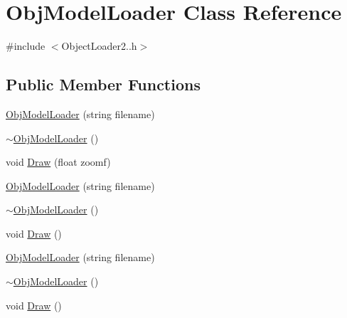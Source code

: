 \hypertarget{class_obj_model_loader}{}\section{Obj\+Model\+Loader Class Reference}
\label{class_obj_model_loader}


{\ttfamily \#include $<$Object\+Loader2..\+h$>$}

\subsection*{Public Member Functions}
\begin{DoxyCompactItemize}
\item 
\mbox{\hyperlink{class_obj_model_loader_afcdb98fbbeba6fa0551b772ca959347d}{Obj\+Model\+Loader}} (string filename)
\item 
\mbox{\hyperlink{class_obj_model_loader_a203757d2c67c25889be3d61f140bc365}{$\sim$\+Obj\+Model\+Loader}} ()
\item 
void \mbox{\hyperlink{class_obj_model_loader_ae71538b366c781ec45f7ebe4fec84ed7}{Draw}} (float zoomf)
\item 
\mbox{\hyperlink{class_obj_model_loader_afcdb98fbbeba6fa0551b772ca959347d}{Obj\+Model\+Loader}} (string filename)
\item 
\mbox{\hyperlink{class_obj_model_loader_a203757d2c67c25889be3d61f140bc365}{$\sim$\+Obj\+Model\+Loader}} ()
\item 
void \mbox{\hyperlink{class_obj_model_loader_a65fe8c583425b7c77577ababd9073d37}{Draw}} ()
\item 
\mbox{\hyperlink{class_obj_model_loader_afcdb98fbbeba6fa0551b772ca959347d}{Obj\+Model\+Loader}} (string filename)
\item 
\mbox{\hyperlink{class_obj_model_loader_a203757d2c67c25889be3d61f140bc365}{$\sim$\+Obj\+Model\+Loader}} ()
\item 
void \mbox{\hyperlink{class_obj_model_loader_a65fe8c583425b7c77577ababd9073d37}{Draw}} ()
\end{DoxyCompactItemize}
